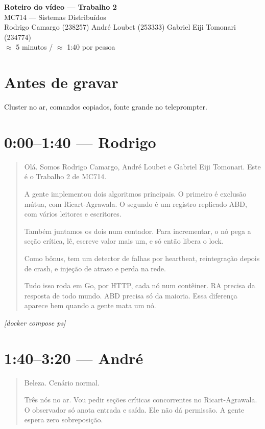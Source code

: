 \documentclass[11pt,a4paper]{article}
\newcommand{\cue}[1]{\par\medskip\noindent\textit{[#1]}\par\medskip}
\begin{document}
\begin{center}
{\LARGE\bfseries Roteiro do vídeo --- Trabalho 2}\\[0.35em]
{\large MC714 --- Sistemas Distribuídos}\\[0.5em]
{\normalsize Rodrigo Camargo (238257) \quad André Loubet (253333) \quad Gabriel Eiji Tomonari (234774)}\\[0.3em]
{\small $\approx$ 5 minutos \quad / \quad $\approx$ 1:40 por pessoa}
\end{center}

\section*{Antes de gravar}
Cluster no ar, comandos copiados, fonte grande no teleprompter.

\section{0:00--1:40 --- Rodrigo}

\begin{quote}\large
Olá. Somos Rodrigo Camargo, André Loubet e Gabriel Eiji Tomonari. Este é o Trabalho 2 de MC714.

A gente implementou dois algoritmos principais. O primeiro é exclusão mútua, com Ricart-Agrawala. O segundo é um registro replicado ABD, com vários leitores e escritores.

Também juntamos os dois num contador. Para incrementar, o nó pega a seção crítica, lê, escreve valor mais um, e só então libera o lock.

Como bônus, tem um detector de falhas por heartbeat, reintegração depois de crash, e injeção de atraso e perda na rede.

Tudo isso roda em Go, por HTTP, cada nó num contêiner. RA precisa da resposta de todo mundo. ABD precisa só da maioria. Essa diferença aparece bem quando a gente mata um nó.
\end{quote}

\cue{docker compose ps}

\section{1:40--3:20 --- André}

\begin{quote}\large
Beleza. Cenário normal.

Três nós no ar. Vou pedir seções críticas concorrentes no Ricart-Agrawala. O observador só anota entrada e saída. Ele não dá permissão. A gente espera zero sobreposição.
\end{quote}
\end{document}
